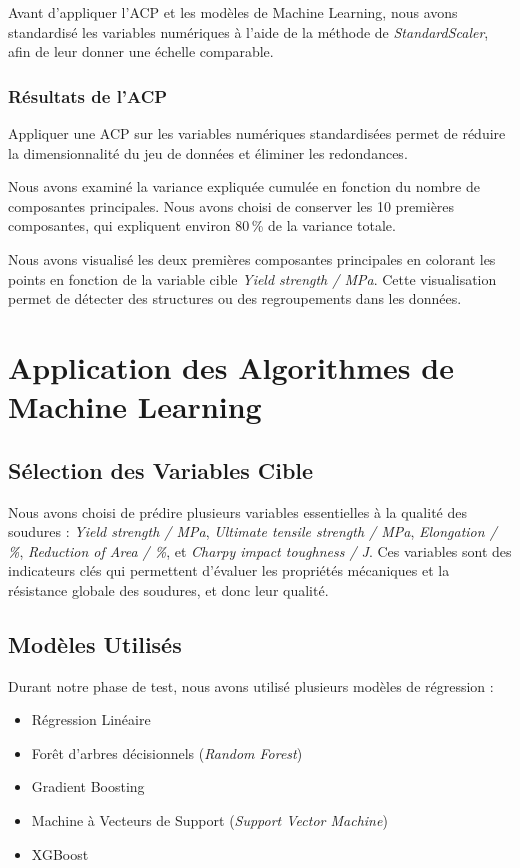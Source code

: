 \documentclass{article}
\begin{document}
Avant d'appliquer l'ACP et les modèles de Machine Learning, nous avons standardisé les variables numériques à l'aide de la méthode de \textit{StandardScaler}, afin de leur donner une échelle comparable.

\subsubsection{Résultats de l'ACP}

Appliquer une ACP sur les variables numériques standardisées permet de réduire la dimensionnalité du jeu de données et éliminer les redondances.

Nous avons examiné la variance expliquée cumulée en fonction du nombre de composantes principales. Nous avons choisi de conserver les 10 premières composantes, qui expliquent environ 80\,\% de la variance totale.

Nous avons visualisé les deux premières composantes principales en colorant les points en fonction de la variable cible \textit{Yield strength / MPa}. Cette visualisation permet de détecter des structures ou des regroupements dans les données.

\section{Application des Algorithmes de Machine Learning}

\subsection{Sélection des Variables Cible}

Nous avons choisi de prédire plusieurs variables essentielles à la qualité des soudures : \textit{Yield strength / MPa}, \textit{Ultimate tensile strength / MPa}, \textit{Elongation / \%}, \textit{Reduction of Area / \%}, et \textit{Charpy impact toughness / J}. Ces variables sont des indicateurs clés qui permettent d’évaluer les propriétés mécaniques et la résistance globale des soudures, et donc leur qualité.

\subsection{Modèles Utilisés}

Durant notre phase de test, nous avons utilisé plusieurs modèles de régression :

\begin{itemize}
\item Régression Linéaire
\item Forêt d’arbres décisionnels (\textit{Random Forest})
\item Gradient Boosting
\item Machine à Vecteurs de Support (\textit{Support Vector Machine})
\item XGBoost
\end{itemize}
\end{document}
